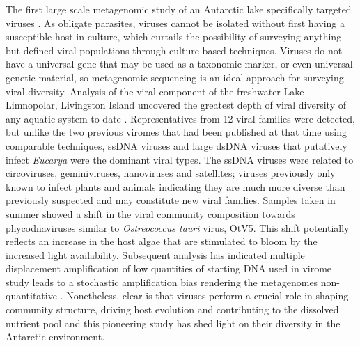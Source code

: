 The first large scale metagenomic study of an Antarctic lake specifically targeted viruses \cite{Lopez-Bueno2009}.
As obligate parasites, viruses cannot be isolated without first having a susceptible host in culture, which curtails the possibility of surveying anything but defined viral populations through culture-based techniques.
Viruses do not have a universal gene that may be used as a taxonomic marker, or even universal genetic material, so metagenomic sequencing is an ideal approach for surveying viral diversity.
Analysis of the viral component of the freshwater Lake Limnopolar, Livingston Island uncovered the greatest depth of viral diversity of any aquatic system to date \cite{Lopez-Bueno2009}.
Representatives from 12 viral families were detected, but unlike the two previous viromes that had been published at that time using comparable techniques, ss\textsc{DNA} viruses and large ds\textsc{DNA} viruses that putatively infect \emph{Eucarya} were the dominant viral types. 
The ss\textsc{DNA} viruses were related to circoviruses, geminiviruses, nanoviruses and satellites; viruses previously only known to infect plants and animals indicating they are much more diverse than previously suspected and may constitute new viral families. 
Samples taken in summer showed a shift in the viral community composition towards phycodnaviruses similar to \emph{Ostreococcus tauri} virus, OtV5. 
This shift potentially reflects an increase in the host algae that are stimulated to bloom by the increased light availability.
Subsequent analysis has indicated multiple displacement amplification of low quantities of starting \textsc{DNA} used in virome study leads to a stochastic amplification bias rendering the metagenomes non-quantitative \cite{Yilmaz2010}.
Nonetheless, clear is that viruses perform a crucial role in shaping community structure, driving host evolution and contributing to the dissolved nutrient pool \cite{Danovaro2011} and this pioneering study has shed light on their diversity in the Antarctic environment.

